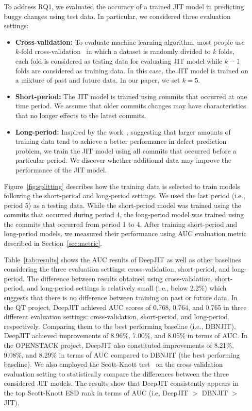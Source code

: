 To address RQ1, we evaluated the accuracy of a trained JIT model in predicting buggy changes using test data. In particular, we considered three evaluation settings: 
\begin{itemize}
\item \textbf{Cross-validation:} To evaluate machine learning algorithm, most people use $k$-fold cross-validation~\cite{kohavi1995study} in which a dataset is randomly divided to $k$ folds, each fold is considered as testing data for evaluating JIT model while $k - 1$ folds are considered as training data. In this case, the JIT model is trained on a mixture of past and future data. In our paper, we set $k = 5$.
\item \textbf{Short-period:} The JIT model is trained using commits that occurred at one time period. We assume that older commits changes may have characteristics that no longer effects to the latest commits. 
\item \textbf{Long-period:} Inspired by the work~\cite{rahman2013sample}, suggesting that larger amounts of training data tend to achieve a better performance in defect prediction problem, we train the JIT model using all commits that occurred before a particular period. We discover whether additional data may improve the performance of the JIT model. 
\end{itemize} 

Figure~\ref{fig:splitting} describes how the training data is selected to train models  following the short-period and long-period settings. We used the last period (i.e., period 5) as a testing data. While the short-period model was trained using the commits that occurred during period 4, the long-period model was trained using the commits that occurred from period 1 to 4. After training short-period and long-period models, we measured their performance using AUC evaluation metric described in Section~\ref{sec:metric}.

Table~\ref{tab:results} shows the AUC results of DeepJIT as well as other baselines considering the three evaluation settings: cross-validation, short-period, and long-period. The difference between results obtained using cross-validation, short-period, and long-period settings is relatively small (i.e., below 2.2\%) which suggests that there is no difference between training on past or future data. 
In the QT project, DeepJIT achieved AUC scores of 0.768, 0.764, and 0.765 in three different evaluation settings: cross-validation, short-period, and long-period, respectively. Comparing them to the best performing baseline (i.e., DBNJIT), DeepJIT achieved improvements of 8.96\%, 7.00\%, and 8.05\% in terms of AUC. In the OPENSTACK project, DeepJIT also constituted improvements of 8.21\%, 9.08\%, and 8.29\% in terms of AUC compared to DBNJIT (the best performing baseline). We also employed the Scott-Knott test~\cite{ghotra2015revisiting} on the cross-validation evaluation setting to statistically compare the differences between the three considered JIT models. The results show that DeepJIT consistently appears in the top Scott-Knott ESD rank in terms of AUC (i.e, DeepJIT $>$ DBNJIT $>$ JIT).  


